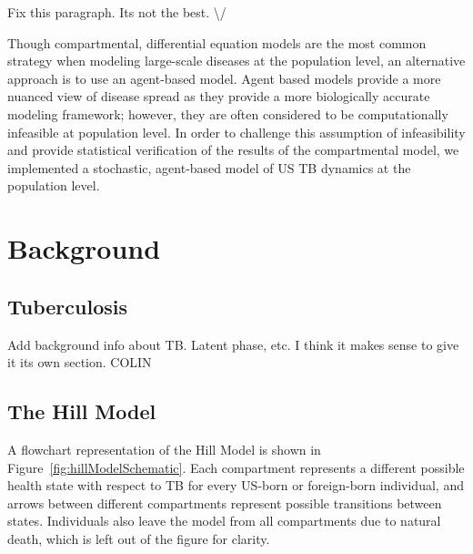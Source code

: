 \documentclass{amsart}
\begin{document}
{\huge \color{red} Fix this paragraph. Its not the best. \textbackslash/}

Though compartmental, differential equation models are the most common strategy
when modeling large-scale diseases at the population level, an alternative
approach is to use an agent-based model. Agent
based models provide a more nuanced view of disease spread as they provide a
more biologically accurate modeling framework; however, they are often
considered to be computationally infeasible at population level. In order to
challenge this assumption of infeasibility and provide statistical verification
of the results of the compartmental model, we implemented a stochastic,
agent-based model of US TB dynamics at the population level.

\section{Background}
\subsection{Tuberculosis}
{\huge \color{red} Add background info about TB. Latent phase, etc. I think it
makes sense to give it its own section. COLIN}
\subsection{The Hill Model}
A flowchart representation of the Hill Model is shown in
Figure~\ref{fig:hillModelSchematic}. Each compartment represents a different
possible health state with respect to TB for every US-born or foreign-born
individual, and arrows between different compartments represent possible
transitions between states.  Individuals also leave the model from all
compartments due to natural death, which is left out of the figure for clarity.
\end{document}
